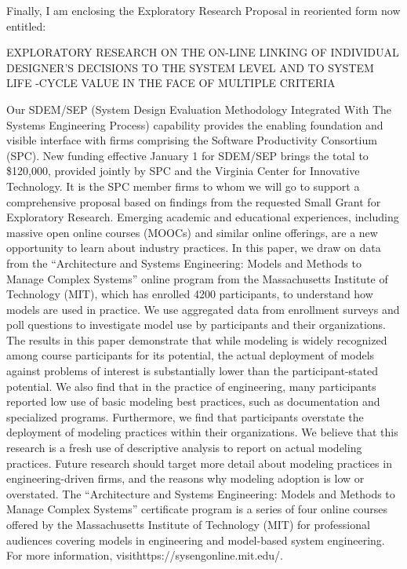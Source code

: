 Finally, I am enclosing the Exploratory Research Proposal in reoriented form now entitled:

EXPLORATORY RESEARCH ON THE ON-LINE LINKING OF
INDIVIDUAL DESIGNER’S DECISIONS TO THE SYSTEM LEVEL AND
TO SYSTEM LIFE -CYCLE VALUE IN THE FACE OF MULTIPLE CRITERIA

Our SDEM/SEP (System Design Evaluation Methodology Integrated With The Systems Engineering Process) capability provides the enabling foundation and visible interface with firms comprising the Software Productivity Consortium (SPC). New funding effective January 1 for SDEM/SEP brings the total to \$120,000, provided jointly by SPC and the Virginia Center for Innovative Technology. It is the SPC member firms to whom we will go to support a comprehensive proposal based on findings from the requested Small Grant for Exploratory Research.
Emerging academic and educational experiences, including massive open online courses (MOOCs) and similar online offerings, are a new opportunity to learn about industry practices. In this paper, we draw on data from the “Architecture and Systems Engineering: Models and Methods to Manage Complex Systems” online program from the Massachusetts Institute of Technology (MIT), which has enrolled 4200 participants, to understand how models are used in practice. We use aggregated data from enrollment surveys and poll questions to investigate model use by participants and their organizations.
The results in this paper demonstrate that while modeling is widely recognized among course participants for its potential, the actual deployment of models against problems of interest is substantially lower than the participant-stated potential. We also find that in the practice of engineering, many participants reported low use of basic modeling best practices, such as documentation and specialized programs. Furthermore, we find that participants overstate the deployment of modeling practices within their organizations.
We believe that this research is a fresh use of descriptive analysis to report on actual modeling practices. Future research should target more detail about modeling practices in engineering-driven firms, and the reasons why modeling adoption is low or overstated.
The “Architecture and Systems Engineering: Models and Methods to Manage Complex Systems” certificate program is a series of four online courses offered by the Massachusetts Institute of Technology (MIT) for professional audiences covering models in engineering and model-based system engineering. For more information, visithttps://sysengonline.mit.edu/.

